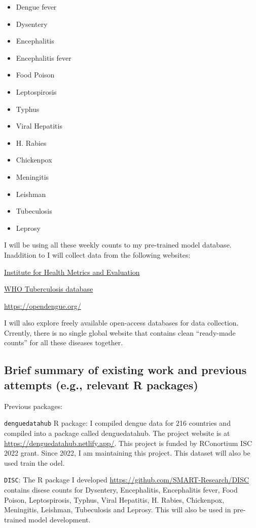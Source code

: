 \documentclass[
]{article}
\begin{document}
\begin{itemize}
\item
  Dengue fever
\item
  Dysentery
\item
  Encephalitis
\item
  Encephalitis fever
\item
  Food Poison
\item
  Leptospirosis
\item
  Typhus
\item
  Viral Hepatitis
\item
  H. Rabies
\item
  Chickenpox
\item
  Meningitis
\item
  Leishman
\item
  Tubeculosis
\item
  Leprosy
\end{itemize}

I will be using all these weekly counts to my pre-trained model
database. Inaddition to I will collect data from the following websites:

\href{https://vizhub.healthdata.org/gbd-results/}{Institute for Health
Metrics and Evaluation}

\href{https://www.who.int/teams/global-tuberculosis-programme/data}{WHO
Tuberculosis database}

\url{https://opendengue.org/}

I will also explore freely available open-access databases for data
collection. Crrently, there is no single global website that contains
clean ``ready-made counts'' for all these diseases together.

\subsection{Brief summary of existing work and previous attempts (e.g.,
relevant R
packages)}\label{brief-summary-of-existing-work-and-previous-attempts-e.g.-relevant-r-packages}

Previous packages:

\texttt{denguedatahub} R package: I compiled dengue data for 216
countries and compiled into a package called denguedatahub. The project
website is at \url{https://denguedatahub.netlify.app/}. This project is
funded by RConortium ISC 2022 grant. Since 2022, I am maintaining this
project. This dataset will also be used train the odel.

\texttt{DISC}: The R package I developed
\url{https://github.com/SMART-Research/DISC} contains disese counts for
Dysentery, Encephalitis, Encephalitis fever, Food Poison, Leptospirosis,
Typhus, Viral Hepatitis, H. Rabies, Chickenpox, Meningitis, Leishman,
Tubeculosis and Leprosy. This will also be used in pre-trained model
development.
\end{document}
